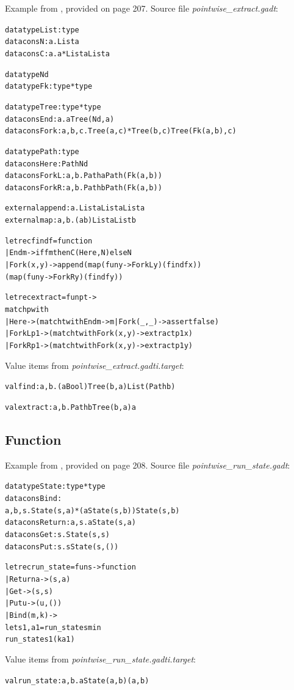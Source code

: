 \documentclass{article}
\newcommand{\tmem}[1]{{\em #1\/}}
\newcommand{\tmverbatim}[1]{{\ttfamily{#1}}}
\newenvironment{tmcode}[1][]{\begin{alltt}}{\end{alltt}}
\begin{document}
Example from {\cite{PracticalGADTsInfer}}, provided on page 207. Source file
{\tmem{pointwise\_extract.gadt}}:
\begin{tmcode}
datatype List : type
datacons N : a. List a
datacons C : a. a * List a  List a

datatype Nd
datatype Fk : type * type

datatype Tree : type * type
datacons End : a. a  Tree (Nd, a)
datacons Fork : a, b, c. Tree (a, c) * Tree (b, c)  Tree (Fk (a, b), c)

datatype Path : type
datacons Here : Path Nd
datacons ForkL : a, b. Path a  Path (Fk (a, b))
datacons ForkR : a, b. Path b  Path (Fk (a, b))

external append : a. List a  List a  List a
external map : a, b. (a  b)  List a  List b

let rec find f = function
  | End m -> if f m then C (Here, N) else N
  | Fork (x, y) -> append (map (fun y -> ForkL y) (find f x))
                          (map (fun y -> ForkR y) (find f y))

let rec extract = fun p t ->
  match p with
    | Here -> (match t with End m -> m | Fork (_, _) -> assert false)
    | ForkL p1 -> (match t with Fork (x, y) -> extract p1 x)
    | ForkR p1 -> (match t with Fork (x, y) -> extract p1 y)
\end{tmcode}
Value items from {\tmem{pointwise\_extract.gadti.target}}:
\begin{tmcode}
val find : a, b. (a  Bool)  Tree (b, a)  List (Path b)

val extract : a, b. Path b  Tree (b, a)  a
\end{tmcode}

\subsection{Function \tmverbatim{run\_state}}

Example from {\cite{PracticalGADTsInfer}}, provided on page 208. Source file
{\tmem{pointwise\_run\_state.gadt}}:
\begin{tmcode}
datatype State : type * type
datacons Bind :
  a, b, s. State (s, a) * (a  State (s, b))  State (s, b)
datacons Return : a, s. a  State (s, a)
datacons Get : s. State (s, s)
datacons Put : s. s  State (s, ())

let rec run_state = fun s -> function
  | Return a -> (s, a)
  | Get -> (s, s)
  | Put u -> (u, ())
  | Bind (m, k) ->
    let s1, a1 = run_state s m in
    run_state s1 (k a1)
\end{tmcode}
Value items from {\tmem{pointwise\_run\_state.gadti.target}}:
\begin{tmcode}
val run_state : a, b. a  State (a, b)  (a, b)
\end{tmcode}
\end{document}
